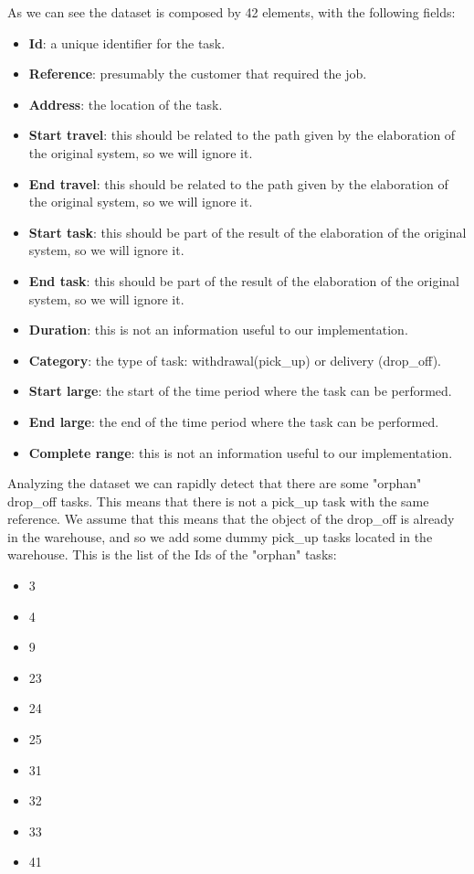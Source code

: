 \documentclass[titlepage]{article}
\begin{document}
As we can see the dataset is composed by 42 elements, with the following fields:
\begin{itemize}
    \item \textbf{Id}: a unique identifier for the task.
    \item \textbf{Reference}: presumably the customer that required the job.
    \item \textbf{Address}: the location of the task.
    \item \textbf{Start travel}: this should be related to the path given by the elaboration of the original system, so we will ignore it.
    \item \textbf{End travel}: this should be related to the path given by the elaboration of the original system, so we will ignore it.
    \item \textbf{Start task}: this should be part of the result of the elaboration of the original system, so we will ignore it.
    \item \textbf{End task}: this should be part of the result of the elaboration of the original system, so we will ignore it.
    \item \textbf{Duration}: this is not an information useful to our implementation.
    \item \textbf{Category}: the type of task: withdrawal(pick\_up) or delivery (drop\_off).
    \item \textbf{Start large}: the start of the time period where the task can be performed.
    \item \textbf{End large}: the end of the time period where the task can be performed.
    \item \textbf{Complete range}: this is not an information useful to our implementation.
\end{itemize}

Analyzing the dataset we can rapidly detect that there are some "orphan" drop\_off tasks. This means that there is not a pick\_up task with the same reference. We assume that this means that the object of the drop\_off is already in the warehouse, and so we add some dummy pick\_up tasks located in the warehouse. This is the list of the Ids of the "orphan" tasks:
\begin{itemize}
    \item 3
    \item 4
    \item 9
    \item 23
    \item 24
    \item 25
    \item 31
    \item 32
    \item 33
    \item 41
\end{itemize}
\end{document}
